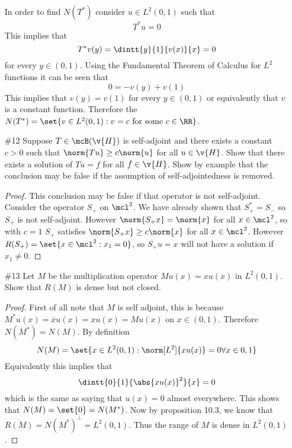 \documentclass[11pt, oneside]{article}
\begin{document}
\begin{enumerate}
    In order to find $N(T^*)$ consider $u \in L^2(0, 1)$ such that
    \[
      T^* u = 0
    \]
    This implies that
    \[
      T^* v(y) = \dintt{y}{1}{v(x)}{x} = 0
    \]
    for every $y \in (0, 1)$.
    Using the Fundamental Theorem of Calculus for $L^2$ functions it can be seen
    that
    \[
      0 = -v(y) + v(1)
    \]
    This implies that $v(y) = v(1)$ for every $y \in (0, 1)$ or equivalently
    that $v$ is a constant function.
    Therefore the
    $N(T^*) = \set{v \in L^2(0, 1): v = c \text{ for some } c \in \RR}$.

  \pagebreak
  \item[\#12]
    Suppose $T \in \mcB(\v{H})$ is self-adjoint and there exists a constant
    $c > 0$ such that $\norm{Tu} \ge c \norm{u}$ for all $u \in \v{H}$.
    Show that there exists a solution of $Tu = f$ for all $f \in \v{H}$.
    Show by example that the conclusion may be false if the assumption of
    self-adjointedness is removed.

    \begin{proof}


      This conclusion may be false if that operator is not self-adjoint.
      Consider the operator $S_+$ on $\mcl^2$.
      We have already shown that $S_+^* = S_-$ so $S_+$ is not self-adjoint.
      However $\norm{S_+x} = \norm{x}$ for all $x \in \mcl^2$, so with $c = 1$
      $S_+$ satisfies $\norm{S_+ x} \ge c \norm{x}$ for all $x \in \mcl^2$.
      However $R(S_+) = \set{x \in \mcl^2 : x_1 = 0}$, so $S_+ u = x$ will not
      have a solution if $x_1 \neq 0$.
    \end{proof}

  \pagebreak
  \item[\#13]
    Let $M$ be the multiplication operator $Mu(x) = xu(x)$ in $L^2(0, 1)$.
    Show that $R(M)$ is dense but not closed.

    \begin{proof}
      First of all note that $M$ is self adjoint, this is because
      $M^* u(x) = \overline{x} u(x) = xu(x) = Mu(x)$ on $x \in (0, 1)$.
      Therefore $N(M^*) = N(M)$.
      By definition
      \[
        N(M) = \set{x \in L^2(0, 1): \norm[L^2]{xu(x)} = 0 \forall x \in {0, 1}}
      \]
      Equivalently this implies that
      \[
        \dintt{0}{1}{\abs{xu(x)}^2}{x} = 0
      \]
      which is the same as saying that $u(x) = 0$ almost everywhere.
      This shows that $N(M) = \set{0} = N(M^*)$.
      Now by proposition 10.3, we know that
      $\overline{R(M)} = N(M^*)^{\perp} = L^2(0,1)$.
      Thus the range of $M$ is dense in $L^2(0, 1)$.


\end{proof}
\end{enumerate}
\end{document}
